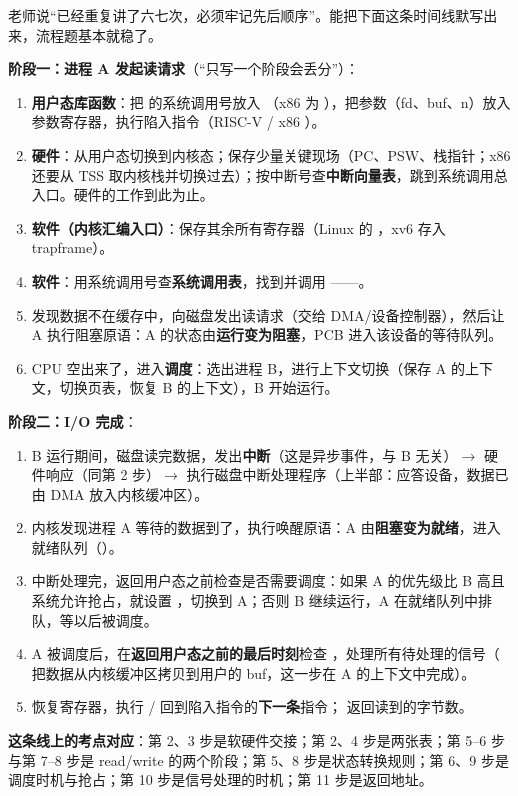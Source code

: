 老师说“已经重复讲了六七次，必须牢记先后顺序”。能把下面这条时间线默写出来，流程题基本就稳了。

\textbf{阶段一：进程 A 发起读请求}（“只写一个阶段会丢分”）：
\begin{enumerate}
    \item \textbf{用户态库函数}：把  的系统调用号放入 （x86 为 ），把参数（fd、buf、n）放入参数寄存器，执行陷入指令（RISC-V  / x86 ）。
    \item \textbf{硬件}：从用户态切换到内核态；保存少量关键现场（PC、PSW、栈指针；x86 还要从 TSS 取内核栈并切换过去）；按中断号查\textbf{中断向量表}，跳到系统调用总入口。硬件的工作到此为止。
    \item \textbf{软件（内核汇编入口）}：保存其余所有寄存器（Linux 的 ，xv6 存入 trapframe）。
    \item \textbf{软件}：用系统调用号查\textbf{系统调用表}，找到并调用 ——。
    \item {} 发现数据不在缓存中，向磁盘发出读请求（交给 DMA/设备控制器），然后让 A 执行阻塞原语：A 的状态由\textbf{运行变为阻塞}，PCB 进入该设备的等待队列。
    \item CPU 空出来了，进入\textbf{调度}：选出进程 B，进行上下文切换（保存 A 的上下文，切换页表，恢复 B 的上下文），B 开始运行。
\end{enumerate}
\textbf{阶段二：I/O 完成}：
\begin{enumerate}[resume]
    \item B 运行期间，磁盘读完数据，发出\textbf{中断}（这是异步事件，与 B 无关）$\to$ 硬件响应（同第 2 步）$\to$ 执行磁盘中断处理程序（上半部：应答设备，数据已由 DMA 放入内核缓冲区）。
    \item 内核发现进程 A 等待的数据到了，执行唤醒原语：A 由\textbf{阻塞变为就绪}，进入就绪队列（）。
    \item 中断处理完，返回用户态之前检查是否需要调度：如果 A 的优先级比 B 高且系统允许抢占，就设置 ，切换到 A；否则 B 继续运行，A 在就绪队列中排队，等以后被调度。
    \item A 被调度后，在\textbf{返回用户态之前的最后时刻}检查 ，处理所有待处理的信号（ 把数据从内核缓冲区拷贝到用户的 buf，这一步在 A 的上下文中完成）。
    \item {} 恢复寄存器，执行 / 回到陷入指令的\textbf{下一条}指令； 返回读到的字节数。
\end{enumerate}
\textbf{这条线上的考点对应}：第 2、3 步是软硬件交接；第 2、4 步是两张表；第 5–6 步与第 7–8 步是 read/write 的两个阶段；第 5、8 步是状态转换规则；第 6、9 步是调度时机与抢占；第 10 步是信号处理的时机；第 11 步是返回地址。

